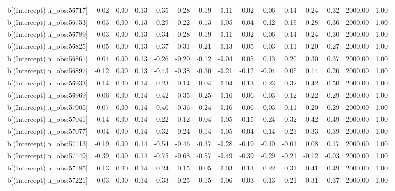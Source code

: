 \begin{table}[ht]
\begin{tabular}{rrrrrrrrrrrrrrr}
  b[(Intercept) n\_obs:56717] & -0.02 & 0.00 & 0.13 & -0.35 & -0.28 & -0.19 & -0.11 & -0.02 & 0.06 & 0.14 & 0.24 & 0.32 & 2000.00 & 1.00 \\ 
  b[(Intercept) n\_obs:56753] & 0.03 & 0.00 & 0.13 & -0.29 & -0.22 & -0.13 & -0.05 & 0.04 & 0.12 & 0.19 & 0.28 & 0.36 & 2000.00 & 1.00 \\ 
  b[(Intercept) n\_obs:56789] & -0.03 & 0.00 & 0.13 & -0.34 & -0.28 & -0.19 & -0.11 & -0.02 & 0.06 & 0.14 & 0.24 & 0.30 & 2000.00 & 1.00 \\ 
  b[(Intercept) n\_obs:56825] & -0.05 & 0.00 & 0.13 & -0.37 & -0.31 & -0.21 & -0.13 & -0.05 & 0.03 & 0.11 & 0.20 & 0.27 & 2000.00 & 1.00 \\ 
  b[(Intercept) n\_obs:56861] & 0.04 & 0.00 & 0.13 & -0.26 & -0.20 & -0.12 & -0.04 & 0.05 & 0.13 & 0.20 & 0.30 & 0.37 & 2000.00 & 1.00 \\ 
  b[(Intercept) n\_obs:56897] & -0.12 & 0.00 & 0.13 & -0.43 & -0.38 & -0.30 & -0.21 & -0.12 & -0.04 & 0.05 & 0.14 & 0.20 & 2000.00 & 1.00 \\ 
  b[(Intercept) n\_obs:56933] & 0.14 & 0.00 & 0.14 & -0.23 & -0.14 & -0.04 & 0.04 & 0.13 & 0.23 & 0.32 & 0.42 & 0.50 & 2000.00 & 1.00 \\ 
  b[(Intercept) n\_obs:56969] & -0.06 & 0.00 & 0.14 & -0.42 & -0.35 & -0.25 & -0.16 & -0.06 & 0.03 & 0.12 & 0.22 & 0.29 & 2000.00 & 1.00 \\ 
  b[(Intercept) n\_obs:57005] & -0.07 & 0.00 & 0.14 & -0.46 & -0.36 & -0.24 & -0.16 & -0.06 & 0.03 & 0.11 & 0.20 & 0.29 & 2000.00 & 1.00 \\ 
  b[(Intercept) n\_obs:57041] & 0.14 & 0.00 & 0.14 & -0.22 & -0.12 & -0.04 & 0.05 & 0.15 & 0.24 & 0.32 & 0.42 & 0.49 & 2000.00 & 1.00 \\ 
  b[(Intercept) n\_obs:57077] & 0.04 & 0.00 & 0.14 & -0.32 & -0.24 & -0.14 & -0.05 & 0.04 & 0.14 & 0.23 & 0.33 & 0.39 & 2000.00 & 1.00 \\ 
  b[(Intercept) n\_obs:57113] & -0.19 & 0.00 & 0.14 & -0.54 & -0.46 & -0.37 & -0.28 & -0.19 & -0.10 & -0.01 & 0.08 & 0.17 & 2000.00 & 1.00 \\ 
  b[(Intercept) n\_obs:57149] & -0.39 & 0.00 & 0.14 & -0.75 & -0.68 & -0.57 & -0.49 & -0.39 & -0.29 & -0.21 & -0.12 & -0.03 & 2000.00 & 1.00 \\ 
  b[(Intercept) n\_obs:57185] & 0.13 & 0.00 & 0.14 & -0.24 & -0.15 & -0.05 & 0.03 & 0.13 & 0.22 & 0.31 & 0.41 & 0.49 & 2000.00 & 1.00 \\ 
  b[(Intercept) n\_obs:57221] & 0.03 & 0.00 & 0.14 & -0.33 & -0.25 & -0.15 & -0.06 & 0.03 & 0.13 & 0.21 & 0.31 & 0.37 & 2000.00 & 1.00 \\ 

\end{tabular}
\end{table}
